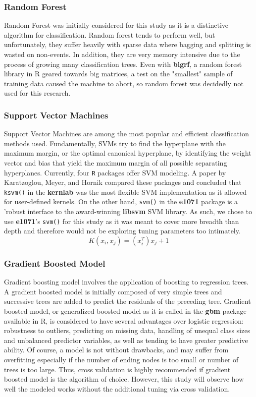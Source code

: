 \documentclass[twoside]{article}
\begin{document}
\begin{multicols}{2}
\subsubsection{Random Forest}
Random Forest was initially considered for this study as it is a distinctive algorithm for classification. Random forest tends to perform well, but unfortunately, they suffer heavily with sparse data where bagging and splitting is wasted on non-events. In addition, they are very memory intensive due to the process of growing many classification trees\cite{19}. Even with \textbf{bigrf}, a random forest library in R geared towards big matrices\cite{20}, a test on the "smallest" sample of training data caused the machine to abort, so random forest was decidedly not used for this research.

\subsubsection{Support Vector Machines}
Support Vector Machines are among the most popular and efficient classification methods used. Fundamentally, SVMs try to find the hyperplane with the maximum margin, or the optimal canonical hyperplane, by identifying the weight vector and bias that yield the maximum margin of all possible separating hyperplanes\cite{23}. Currently, four \texttt{R} packages offer SVM modeling. A paper by Karatzoglou, Meyer, and Hornik compared these packages and concluded that \texttt{ksvm()} in the \textbf{kernlab} was the most flexible SVM implementation as it allowed for user-defined kernels. On the other hand, \texttt{svm()} in the \textbf{e1071} package is a 'robust interface to the award-winning \textbf{libsvm} SVM library\cite{21}. As such, we chose to use \textbf{e1071}'s \texttt{svm()} for this study as it was meant to cover more breadth than depth and therefore would not be exploring tuning parameters too intimately.
\[ K(x_i, x_j) = (x_i^T)x_j + 1 \]

\subsubsection{Gradient Boosted Model}
Gradient boosting model involves the application of boosting to regression trees. A gradient boosted model is initially composed of very simple trees and successive trees are added to predict the residuals of the preceding tree\cite{27}. Gradient boosted model, or generalized boosted model as it is called in the \textbf{gbm} package available in R, is considered to have several advantages over logistic regression: robustness to outliers, predicting on missing data, handling of unequal class sizes and unbalanced predictor variables, as well as tending to have greater predictive ability\cite{7}. Of course, a model is not without drawbacks, and may suffer from overfitting especially if the number of ending nodes is too small or number of trees is too large\cite{7}. Thus, cross validation is highly recommended if gradient boosted model is the algorithm of choice. However, this study will observe how well the modeled works without the additional tuning via cross validation.


\end{multicols}
\end{document}
